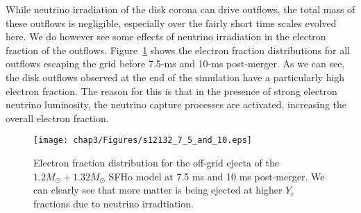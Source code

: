 While neutrino irradiation of the disk corona can drive outflows, the total mass of these outflows is negligible, especially over the fairly short time scales evolved here.
We do however see some effects of neutrino irradiation in the electron fraction of the outflows. %
Figure~\ref{fig:s12132_75_and_10} shows the electron fraction distributions for all outflows escaping the grid before 7.5-ms and 10-ms post-merger. As we can see, 
the disk outflows observed at the end of the simulation have a particularly high electron fraction.
The reason for this is that in the presence of strong electron neutrino luminosity, the neutrino capture processes are activated, increasing the overall electron fraction.

\begin{figure}[H]
  \centering
  \texttt{[image: chap3/Figures/s12132\_7\_5\_and\_10.eps]}
\caption{
  Electron fraction distribution for the off-grid ejecta of the $1.2M_\odot + 1.32M_\odot$ SFHo model at 7.5 ms and 10 ms post-merger. We can clearly see that more matter is being ejected at higher $Y_e$ fractions due to neutrino irradtiation.
}
\label{fig:s12132_75_and_10}
\end{figure}
%



